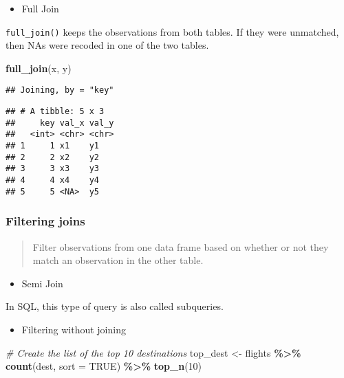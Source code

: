 \documentclass[
]{book}
\newenvironment{Shaded}{\begin{snugshade}}{\end{snugshade}}
\newcommand{\CommentTok}[1]{\textcolor[rgb]{0.56,0.35,0.01}{\textit{#1}}}
\newcommand{\DataTypeTok}[1]{\textcolor[rgb]{0.13,0.29,0.53}{#1}}
\newcommand{\DecValTok}[1]{\textcolor[rgb]{0.00,0.00,0.81}{#1}}
\newcommand{\KeywordTok}[1]{\textcolor[rgb]{0.13,0.29,0.53}{\textbf{#1}}}
\newcommand{\NormalTok}[1]{#1}
\newcommand{\OperatorTok}[1]{\textcolor[rgb]{0.81,0.36,0.00}{\textbf{#1}}}
\newcommand{\OtherTok}[1]{\textcolor[rgb]{0.56,0.35,0.01}{#1}}
\newcommand{\StringTok}[1]{\textcolor[rgb]{0.31,0.60,0.02}{#1}}
\providecommand{\tightlist}{%
  \setlength{\itemsep}{0pt}\setlength{\parskip}{0pt}}
\begin{document}
\begin{itemize}
\tightlist
\item
  Full Join
\end{itemize}

\texttt{full\_join()} keeps the observations from both tables. If they were unmatched, then NAs were recoded in one of the two tables.

\begin{Shaded}
\begin{Highlighting}[]
\KeywordTok{full\_join}\NormalTok{(x, y)}
\end{Highlighting}
\end{Shaded}

\begin{verbatim}
## Joining, by = "key"
\end{verbatim}

\begin{verbatim}
## # A tibble: 5 x 3
##     key val_x val_y
##   <int> <chr> <chr>
## 1     1 x1    y1   
## 2     2 x2    y2   
## 3     3 x3    y3   
## 4     4 x4    y4   
## 5     5 <NA>  y5
\end{verbatim}

\hypertarget{filtering-joins}{%
\subsubsection{Filtering joins}\label{filtering-joins}}

\begin{quote}
Filter observations from one data frame based on whether or not they match an observation in the other table.
\end{quote}

\begin{itemize}
\tightlist
\item
  Semi Join
\end{itemize}

In SQL, this type of query is also called subqueries.

\begin{itemize}
\tightlist
\item
  Filtering without joining
\end{itemize}

\begin{Shaded}
\begin{Highlighting}[]
\CommentTok{\# Create the list of the top 10 destinations}
\NormalTok{top\_dest \textless{}{-}}\StringTok{ }\NormalTok{flights }\OperatorTok{\%\textgreater{}\%}
\StringTok{  }\KeywordTok{count}\NormalTok{(dest, }\DataTypeTok{sort =} \OtherTok{TRUE}\NormalTok{) }\OperatorTok{\%\textgreater{}\%}
\StringTok{  }\KeywordTok{top\_n}\NormalTok{(}\DecValTok{10}\NormalTok{)}
\end{Highlighting}
\end{Shaded}
\end{document}
